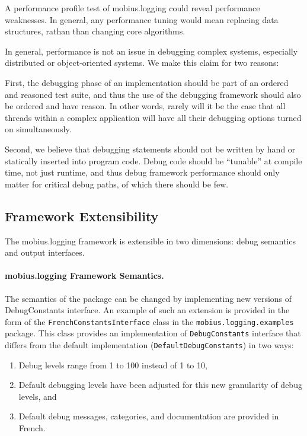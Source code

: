 \documentclass{article}
\begin{document}
A performance profile test of mobius.logging could reveal performance
weaknesses. In general, any performance tuning would mean replacing
data structures, rathan than changing core algorithms.

In general, performance is not an issue in debugging complex systems,
especially distributed or object-oriented systems.  We make this claim
for two reasons:

First, the debugging phase of an implementation should be part of an
ordered and reasoned test suite, and thus the use of the debugging
framework should also be ordered and have reason.  In other words,
rarely will it be the case that all threads within a complex
application will have all their debugging options turned on
simultaneously.  

Second, we believe that debugging statements should not be written by
hand or statically inserted into program code.  Debug code
should be ``tunable'' at compile time, not just runtime, and thus
debug framework performance should only matter for critical debug
paths, of which there should be few.  

\subsection{Framework Extensibility}

The mobius.logging framework is extensible in two dimensions: debug semantics
and output interfaces.  

\paragraph{mobius.logging Framework Semantics.}
The semantics of the package can be changed by implementing new
versions of DebugConstants interface.  An example of such an extension
is provided in the form of the
\texttt{FrenchConstantsInterface} class in the
\texttt{mobius.logging.examples} package.  This class
provides an implementation of \texttt{DebugConstants} interface that
differs from the default implementation (\texttt{DefaultDebugConstants})
in two ways:
\begin{enumerate}
\item Debug levels range from 1 to 100 instead of 1 to 10, 
\item Default debugging levels have been adjusted for this new
  granularity of debug levels, and
\item Default debug messages, categories, and documentation are
  provided in French.
\end{enumerate}
\end{document}
